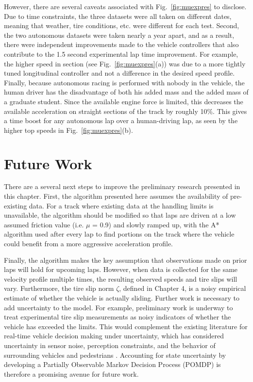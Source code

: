 {{{However, there are several caveats associated with Fig.~\ref{fig:muexpres} to disclose. Due to time constraints, the
three datasets were all taken on different dates, meaning that weather, tire conditions, etc. were different for each test. Second,
the two autonomous datasets were taken nearly a year apart, and as a result, there were independent improvements made to the vehicle controllers
that also contribute to the 1.5 second experimental lap time improvement. For example, the higher speed in section  (see Fig.~\ref{fig:muexpres}(a))
was due to a more tightly tuned longitudinal controller and not a difference in the desired speed profile. Finally, because autonomous racing is performed with nobody in the vehicle, 
the human driver has the disadvantage of both his added mass and the added mass of a graduate student. Since
the available engine force is limited, this decreases the available acceleration on straight sections of the track by roughly 10\%. 
This gives a time boost for any autonomous lap over a human-driving lap, as seen by the higher top speeds in Fig.~\ref{fig:muexpres}(b).
 

\section{Future Work}

There are a several next steps to improve the preliminary research presented in this chapter. First, the algorithm presented here assumes
the availability of pre-existing data. For a track where existing data at the handling limits is unavailable, the algorithm should be modified
so that laps are driven at a low assumed friction value (i.e. $\mu$ = 0.9) and slowly ramped up, with the A* algorithm used after
every lap to find portions on the track where the vehicle could benefit from a more aggressive acceleration profile. 

Finally, the algorithm makes the key assumption that observations made on prior laps will hold for upcoming laps. However, when data is collected for the same
velocity profile multiple times, the resulting observed speeds and tire slips will vary. Furthermore, the tire slip norm $\zeta$, defined in Chapter 4,
is a noisy empirical estimate of whether the vehicle is actually sliding. Further
work is necessary to add uncertainty to the model. For example, preliminary work is underway to treat experimental tire slip measurements as noisy
indicators of whether the vehicle has exceeded the limits. This would complement the existing literature for real-time vehicle decision making under uncertainty, which
has considered uncertainty in sensor noise, perception constraints, and the behavior of surrounding vehicles and pedestrians \cite{brechtel}\cite{ulbrich}\cite{wei}. Accounting for state uncertainty by developing a Partially Observable Markov Decision Process (POMDP)
is therefore a promising avenue for future work. 

}}}
